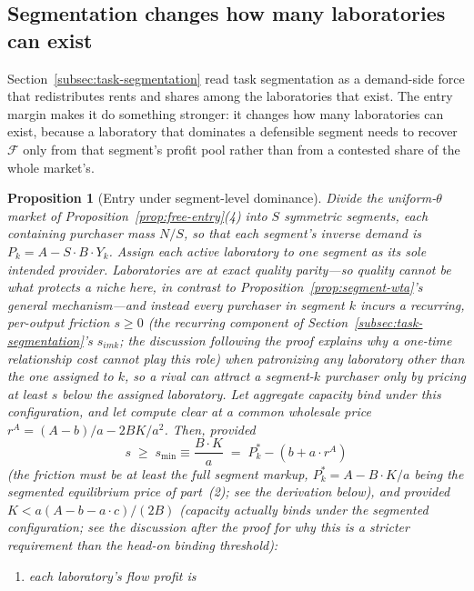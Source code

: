 \documentclass[11pt]{article}
\newtheorem{proposition}{Proposition}
\begin{document}
\subsection{Segmentation changes how many laboratories can exist}
\label{subsec:segmented-entry}

Section~\ref{subsec:task-segmentation} read task segmentation as a demand-side force that redistributes rents and shares among the laboratories that exist. The entry margin makes it do something stronger: it changes how many laboratories can exist, because a laboratory that dominates a defensible segment needs to recover $\mathcal F$ only from that segment's profit pool rather than from a contested share of the whole market's.

\begin{proposition}[Entry under segment-level dominance]\label{prop:segmented-entry}
Divide the uniform-$\theta$ market of Proposition~\ref{prop:free-entry}(4) into $S$ symmetric segments, each containing purchaser mass $N/S$, so that each segment's inverse demand is $P_k=A-S\cdot B\cdot Y_k$. Assign each active laboratory to one segment as its sole intended provider. Laboratories are at exact quality parity---so quality cannot be what protects a niche here, in contrast to Proposition~\ref{prop:segment-wta}'s general mechanism---and instead every purchaser in segment $k$ incurs a \emph{recurring, per-output} friction $s\geq0$ (the recurring component of Section~\ref{subsec:task-segmentation}'s $s_{imk}$; the discussion following the proof explains why a one-time relationship cost cannot play this role) when patronizing any laboratory other than the one assigned to $k$, so a rival can attract a segment-$k$ purchaser only by pricing at least $s$ below the assigned laboratory. Let aggregate capacity bind under this configuration, and let compute clear at a common wholesale price $r^{A}=(A-b)/a-2BK/a^{2}$. Then, provided
\begin{equation}\label{eq:friction-threshold}s\;\geq\;s_{\min}\equiv\frac{B\cdot K}{a}\;=\;P_k^{*}-\left(b+a\cdot r^{A}\right)\end{equation}
(the friction must be at least the full segment markup, $P_k^{*}=A-B\cdot K/a$ being the segmented equilibrium price of part~(2); see the derivation below),
and provided $K<a(A-b-a\cdot c)/(2B)$ (capacity actually binds under the segmented configuration; see the discussion after the proof for why this is a stricter requirement than the head-on binding threshold):
\begin{enumerate}
\item each laboratory's flow profit is

\end{enumerate}
\end{proposition}
\end{document}
